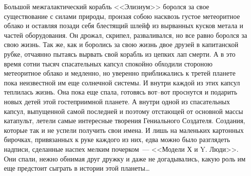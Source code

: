 \newpage 

     Большой межгалактический корабль <<Элизиум>> боролся за свое 
существование с силами природы, пронзая собою насквозь густое 
метеоритное облако и оставляя позади себя блестящий шлейф из вырванных 
кусков метала и частей оборудования. Он дрожал, скрипел, разваливался, 
но все равно боролся за свою жизнь. Так же, как и боролись за свою жизнь
двое друзей в капитанской рубке, отчаянно пытаясь вырвать свой корабль 
из цепких лап смерти. А в это время сотни тысяч спасательных капсул 
спокойно обходили стороною метеоритное облако и медленно, но уверенно 
приближались к третей планете пока неизвестной им еще солнечной системы.
И внутри каждой из этих капсул теплилась жизнь. Она пока еще спала, 
готовясь вот--вот проснутся и подарить новых детей этой гостеприимной 
планете. А внутри одной из спасательных капсул, выпущенной самой 
последней и поэтому отстающей от основной массы катапульт, летели самые 
интересные творения Гениального Создателя.  Создания, которые так и не 
успели получить свои имена. И лишь на маленьких картонных бирочках, 
привязанных к руке каждого из них, едва можно было разглядеть надписи, 
сделанные наспех мелким почерком~--- <<Модели Х и Y. Люди>>.  Они спали, 
нежно обнимая друг дружку и даже не догадывались, какую роль им еще 
предстоит сыграть в истории этой планеты\ldots